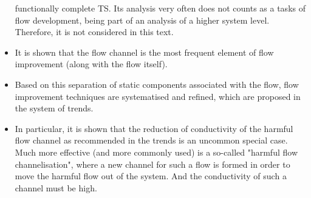 \documentclass[a4paper,11pt]{article}
\begin{document}
\begin{itemize}
  functionally complete TS. Its analysis very often does not counts as a tasks
  of flow development, being part of an analysis of a higher system level.
  Therefore, it is not considered in this text.
\item It is shown that the flow channel is the most frequent element of flow
  improvement (along with the flow itself).
\item Based on this separation of static components associated with the flow,
  flow improvement techniques are systematised and refined, which are proposed
  in the system of trends.
\item In particular, it is shown that the reduction of conductivity of the
  harmful flow channel as recommended in the trends is an uncommon special
  case. Much more effective (and more commonly used) is a so-called "harmful
  flow channelisation", where a new channel for such a flow is formed in order
  to move the harmful flow out of the system. And the conductivity of such a
  channel must be high.
\end{itemize}
\end{document}
